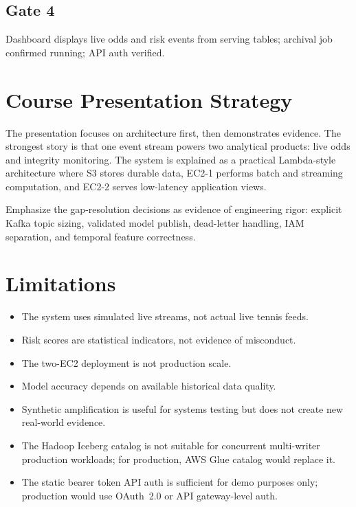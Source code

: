 \documentclass[11pt,a4paper]{article}
\begin{document}
\subsection{Gate 4}
Dashboard displays live odds and risk events from serving tables; archival job confirmed running;
API auth verified.

\section{Course Presentation Strategy}

The presentation focuses on architecture first, then demonstrates evidence. The strongest story
is that one event stream powers two analytical products: live odds and integrity monitoring. The
system is explained as a practical Lambda-style architecture where S3 stores durable data, EC2-1
performs batch and streaming computation, and EC2-2 serves low-latency application views.

Emphasize the gap-resolution decisions as evidence of engineering rigor: explicit Kafka topic
sizing, validated model publish, dead-letter handling, IAM separation, and temporal feature
correctness.

\section{Limitations}

\begin{itemize}[nosep]
  \item The system uses simulated live streams, not actual live tennis feeds.
  \item Risk scores are statistical indicators, not evidence of misconduct.
  \item The two-EC2 deployment is not production scale.
  \item Model accuracy depends on available historical data quality.
  \item Synthetic amplification is useful for systems testing but does not create new
    real-world evidence.
  \item The Hadoop Iceberg catalog is not suitable for concurrent multi-writer production
    workloads; for production, AWS Glue catalog would replace it.
  \item The static bearer token API auth is sufficient for demo purposes only; production
    would use OAuth~2.0 or API gateway-level auth.
\end{itemize}
\end{document}

